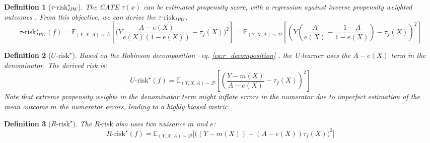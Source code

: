 \documentclass[10pt]{article}
\newtheorem{definition}{Definition}
\begin{document}
\begin{multicols}{2}
    \begin{definition}[$\tau\text{-risk}^{\star}_{IPW}$]\label{def:tau_ipw_risk}
        \cite{wager_estimation_2018}
        The CATE $\tau(x)$ can be estimated propensity score, with a
        regression against inverse propensity weighted outcomes \cite{
            athey2016recursive,gutierrez_causal_2016,wager_estimation_2018}. From this objective, we can derive
        the $\tau\text{-risk}_{IPW}$.
        \begin{equation*}
            \tau\text{-risk}^{\star}_{IPW}(f) =\mathbb{E}_{(Y, X, A) \sim
                \mathcal D} \left[ \Big(Y \frac{A - e(X)}{e(X)
                    (1-e(X))}-\tau_f\left(X\right)\Big)^2 \right]  =\mathbb{E}_{(Y, X, A)
                \sim \mathcal D} \left[ \left(Y \left( \frac{A}{e(X)} -
                \frac{1-A}{1-e(X)}\right)-\tau_f\left(X\right)\right)^2 \right]
        \end{equation*}
    \end{definition}

    \begin{definition}[$U\text{-risk}^{\star}$]\label{def:u_risk}
        \cite{kunzel_metalearners_2019,nie_quasioracle_2017} Based on
        the Robinson decomposition --eq. \ref{eq:r_decomposition}
        \cite{robinson_rootnconsistent_1988}, the U-learner
        uses the $A-e(X)$ term
        in the denominator. The derived risk is:
        \begin{equation*}
            U\text{-risk}^{\star}(f) =\mathbb{E}_{(Y, X, A) \sim \mathcal D}
            \left[
                \left( \frac{Y-m\left(X\right)}{A-e\left(X\right)} -
                \tau_f\left(X\right)\right)^{2} \right]
        \end{equation*}
        Note that extreme propensity weights in the
        denominator term might inflate errors in the numerator due to imperfect
        estimation of the mean outcome $m$
        the numerator errors, leading to a highly biased metric.
    \end{definition}

    \begin{definition}[$R\text{-risk}^{\star}$]\label{def:r_risk}
        \cite{nie_quasioracle_2017,schuler_comparison_2018}
        The $R\text{-risk}$ also uses two nuisance $m$ and $e$:
        \begin{equation*}
            R\text{-risk}^{\star}(f) =\mathbb{E}_{(Y, X, A) \sim \mathcal D} \big[
                \big(\left(Y-m\left(X\right)\right) -\left(A-e\left(X\right)\right) \tau_f\left(X\right)\big)^{2} \big]
        \end{equation*}
    \end{definition}


\end{multicols}
\end{document}
